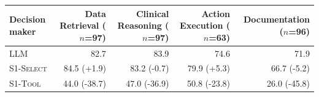 \begin{tabular}{lrrrr}
\toprule
Decision maker & Data Retrieval ($n$=97) & Clinical Reasoning ($n$=97) & Action Execution ($n$=63) & Documentation ($n$=96) \\
\midrule
\textsc{LLM} & 82.7 & 83.9 & 74.6 & 71.9 \\
\textsc{S1-Select} & 84.5 (+1.9) & 83.2 (-0.7) & 79.9 (+5.3) & 66.7 (-5.2) \\
\textsc{S1-Tool} & 44.0 (-38.7) & 47.0 (-36.9) & 50.8 (-23.8) & 26.0 (-45.8) \\
\bottomrule
\end{tabular}
